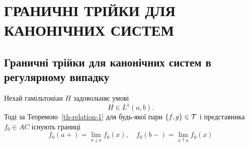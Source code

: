\section{ГРАНИЧНІ ТРІЙКИ ДЛЯ КАНОНІЧНИХ СИСТЕМ}

\subsection{Граничні трійки для канонічних систем в регулярному випадку}

Нехай гамільтоніан $H$ задовольняє умові 
\begin{equation}\label{eq-4.1}
	H \in L^1(a,b).
\end{equation}
Тоді за Теоремою~\ref{th-relation-1} для будь-якої пари $\{f,g\}\in\mathcal{T}$ і представника $f_0\in AC$ існують границі
\begin{equation}\label{eq-4.2}
	f_0(a+) = \lim_{x\downarrow a} f_0(x), \quad f_0(b-) = \lim_{x\uparrow a} f_0(x)
\end{equation}

